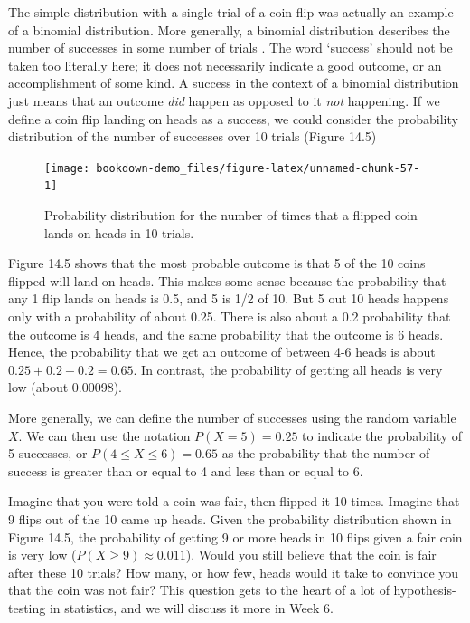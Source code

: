 \documentclass[
]{scrbook}
\begin{document}
The simple distribution with a single trial of a coin flip was actually an example of a binomial distribution.
More generally, a binomial distribution describes the number of successes in some number of trials \citep{Miller2004}.
The word `success' should not be taken too literally here; it does not necessarily indicate a good outcome, or an accomplishment of some kind.
A success in the context of a binomial distribution just means that an outcome \emph{did} happen as opposed to it \emph{not} happening.
If we define a coin flip landing on heads as a success, we could consider the probability distribution of the number of successes over 10 trials (Figure 14.5)

\begin{figure}
\texttt{[image: bookdown-demo\_files/figure-latex/unnamed-chunk-57-1]} \caption{Probability distribution for the number of times that a flipped coin lands on heads in 10 trials.}\label{fig:unnamed-chunk-57}
\end{figure}

Figure 14.5 shows that the most probable outcome is that 5 of the 10 coins flipped will land on heads.
This makes some sense because the probability that any 1 flip lands on heads is 0.5, and 5 is 1/2 of 10.
But 5 out 10 heads happens only with a probability of about 0.25.
There is also about a 0.2 probability that the outcome is 4 heads, and the same probability that the outcome is 6 heads.
Hence, the probability that we get an outcome of between 4-6 heads is about \(0.25 + 0.2 + 0.2 = 0.65\).
In contrast, the probability of getting all heads is very low (about 0.00098).

More generally, we can define the number of successes using the random variable \(X\).
We can then use the notation \(P(X = 5) = 0.25\) to indicate the probability of 5 successes, or \(P(4 \leq X \leq 6) = 0.65\) as the probability that the number of success is greater than or equal to 4 and less than or equal to 6.

Imagine that you were told a coin was fair, then flipped it 10 times.
Imagine that 9 flips out of the 10 came up heads.
Given the probability distribution shown in Figure 14.5, the probability of getting 9 or more heads in 10 flips given a fair coin is very low (\(P(X \geq 9) \approx 0.011\)).
Would you still believe that the coin is fair after these 10 trials?
How many, or how few, heads would it take to convince you that the coin was not fair?
This question gets to the heart of a lot of hypothesis-testing in statistics, and we will discuss it more in Week 6.
\end{document}
